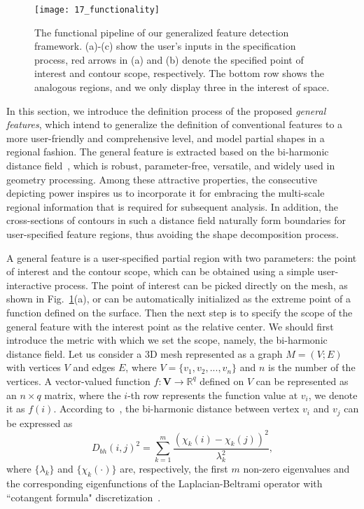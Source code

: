 \begin{figure}
\begin{center}
\texttt{[image: 17\_functionality]}
\end{center}
\caption{The functional pipeline of our generalized feature detection
  framework. (a)-(c) show the user's inputs in the
  specification process, red arrows in (a) and (b) denote the
  specified point of interest and contour scope, respectively. The bottom
  row shows the analogous regions, and we only display three in the interest
  of space.}
\label{specification}
\end{figure}

In this section, we introduce the definition process of the proposed
\emph{general features}, which intend to generalize the definition of
conventional features to a more user-friendly and
comprehensive level, and model partial shapes in a regional fashion.
The general feature is extracted based on the bi-harmonic distance
field~\cite{Lipman:2010}, which is robust, parameter-free, versatile,
and widely used in geometry processing.  Among these attractive
properties, the consecutive depicting power inspires us to incorporate
it for embracing the multi-scale regional information that is required
for subsequent analysis. In addition, the cross-sections of contours
in such a distance field naturally form boundaries for user-specified
feature regions, thus avoiding the shape decomposition process.

A general feature is a user-specified partial region
  with two parameters: the point of interest and the contour scope,
  which can be obtained using a simple user-interactive process. The
  point of interest can be picked directly on the mesh, as shown in
  Fig.~\ref{specification}(a), or can be automatically initialized
  as the extreme point of a function defined on the surface.  Then
the next step is to specify the scope of the general feature with the
interest point as the relative center. We should first introduce the
metric with which we set the scope, namely, the bi-harmonic distance
field. Let us consider a 3D mesh represented as a graph $M = (V;E)$
with vertices $V$ and edges $E$, where $V = \{v_1,v_2,...,v_n\}$ and
$n$ is the number of the vertices. A vector-valued function $f \colon
\textbf{V} \rightarrow \mathbb{R}^q $ defined on $V$ can be
represented as an $n \times q$ matrix, where the $i$-th row represents
the function value at $v_i$, we denote it as $f(i)$.  According
to~\cite{Lipman:2010}, the bi-harmonic distance between vertex $v_i$
and $v_j$ can be expressed as
\begin{equation}
\label{eq:bd}
D_{bh}(i,j)^2=\sum_{k=1}^{m}\frac{(\chi_k(i)-\chi_k(j))^2}{\lambda_k^2},
\end{equation}
where $\{\lambda_k\}$ and $\{\chi_k(\cdot)\}$ are, respectively, the
first $m$ non-zero eigenvalues and the corresponding eigenfunctions of
the Laplacian-Beltrami operator with ``cotangent formula"
discretization~\cite{Meyer2003}.

